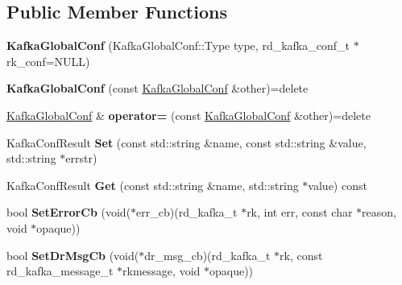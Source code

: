 \subsection*{Public Member Functions}
\begin{DoxyCompactItemize}
\item 
{\bfseries Kafka\+Global\+Conf} (Kafka\+Global\+Conf\+::\+Type type, rd\+\_\+kafka\+\_\+conf\+\_\+t $\ast$rk\+\_\+conf=N\+U\+LL)\hypertarget{classlog2hdfs_1_1KafkaGlobalConf_aeffc5a410d44fd4a48c835af1dac1933}{}\label{classlog2hdfs_1_1KafkaGlobalConf_aeffc5a410d44fd4a48c835af1dac1933}

\item 
{\bfseries Kafka\+Global\+Conf} (const \hyperlink{classlog2hdfs_1_1KafkaGlobalConf}{Kafka\+Global\+Conf} \&other)=delete\hypertarget{classlog2hdfs_1_1KafkaGlobalConf_aef5305d0446f0ee61484545a77746ddd}{}\label{classlog2hdfs_1_1KafkaGlobalConf_aef5305d0446f0ee61484545a77746ddd}

\item 
\hyperlink{classlog2hdfs_1_1KafkaGlobalConf}{Kafka\+Global\+Conf} \& {\bfseries operator=} (const \hyperlink{classlog2hdfs_1_1KafkaGlobalConf}{Kafka\+Global\+Conf} \&other)=delete\hypertarget{classlog2hdfs_1_1KafkaGlobalConf_a8bd4653616a95a7fa146c3e88d0258b0}{}\label{classlog2hdfs_1_1KafkaGlobalConf_a8bd4653616a95a7fa146c3e88d0258b0}

\item 
Kafka\+Conf\+Result {\bfseries Set} (const std\+::string \&name, const std\+::string \&value, std\+::string $\ast$errstr)\hypertarget{classlog2hdfs_1_1KafkaGlobalConf_a5961838fea3e2f86294408224995f4f2}{}\label{classlog2hdfs_1_1KafkaGlobalConf_a5961838fea3e2f86294408224995f4f2}

\item 
Kafka\+Conf\+Result {\bfseries Get} (const std\+::string \&name, std\+::string $\ast$value) const \hypertarget{classlog2hdfs_1_1KafkaGlobalConf_aa229932c6969f605b852e45b77490b5d}{}\label{classlog2hdfs_1_1KafkaGlobalConf_aa229932c6969f605b852e45b77490b5d}

\item 
bool {\bfseries Set\+Error\+Cb} (void($\ast$err\+\_\+cb)(rd\+\_\+kafka\+\_\+t $\ast$rk, int err, const char $\ast$reason, void $\ast$opaque))\hypertarget{classlog2hdfs_1_1KafkaGlobalConf_ab4a25ce619291f06177f171bbdd380f3}{}\label{classlog2hdfs_1_1KafkaGlobalConf_ab4a25ce619291f06177f171bbdd380f3}

\item 
bool {\bfseries Set\+Dr\+Msg\+Cb} (void($\ast$dr\+\_\+msg\+\_\+cb)(rd\+\_\+kafka\+\_\+t $\ast$rk, const rd\+\_\+kafka\+\_\+message\+\_\+t $\ast$rkmessage, void $\ast$opaque))\hypertarget{classlog2hdfs_1_1KafkaGlobalConf_a409ae11df58eae9c05451431139a8a18}{}\label{classlog2hdfs_1_1KafkaGlobalConf_a409ae11df58eae9c05451431139a8a18}

\end{DoxyCompactItemize}
